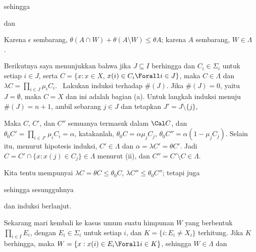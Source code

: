 {

\noindent sehingga


\noindent dan

\noindent Karena $\epsilon$ sembarang, $\theta(A\cap W)+\theta(A\setminus
W)\le\theta A$; karena $A$ sembarang, $W\in\Lambda$.

\medskip

Berikutnya saya menunjukkan bahwa jika $J\subseteq I$ berhingga dan $C_i\in\Sigma_i$ untuk
setiap $i\in J$, serta $C=\{x:x\in X$, $x(i)\in C_i\Forall i\in J\}$,
maka $C\in\Lambda$ dan $\lambda C=\prod_{i\in J}\mu_iC_i$. \Prf\
Lakukan induksi terhadap $\#(J)$. Jika $\#(J)=0$, yaitu $J=\emptyset$, maka $C=X$
dan ini adalah bagian (a). Untuk langkah induksi menuju $\#(J)=n+1$, ambil sebarang
$j\in J$ dan tetapkan $J'=J\setminus\{j\}$,


\Centerline{$C''=C'\setminus C=\{x:x\in C'$, $x(j)\in X_j\setminus
C_j\}.$}

\noindent Maka $C$, $C'$, dan $C''$ semuanya termasuk dalam $\Cal C$, dan $\theta_0
C'=\prod_{i\in J'}\mu_iC_i=\alpha$, katakanlah, $\theta_0C=\alpha\mu_jC_j$,
$\theta_0C''=\alpha(1-\mu_jC_j)$. Selain itu, menurut hipotesis
induksi, $C'\in\Lambda$ dan $\alpha=\lambda C'=\theta C'$. Jadi
$C=C'\cap\{x:x(j)\in C_j\}\in\Lambda$ menurut (ii), dan $C''=C'\setminus
C\in\Lambda$.

Kita tentu mempunyai $\lambda C=\theta C\le\theta_0C$, $\lambda
C''\le\theta_0C''$; tetapi juga


\noindent sehingga sesungguhnya


\noindent dan induksi berlanjut.\ \Qed

\medskip

 Sekarang mari kembali ke kasus umum suatu himpunan $W$ yang
berbentuk $\prod_{i\in I}E_i$, dengan $E_i\in\Sigma_i$ untuk setiap $i$, dan
$K=\{i:E_i\ne X_i\}$ terhitung. Jika $K$ berhingga, maka
$W=\{x:x(i)\in E_i\Forall i\in K\}$, sehingga $W\in\Lambda$ dan

}

